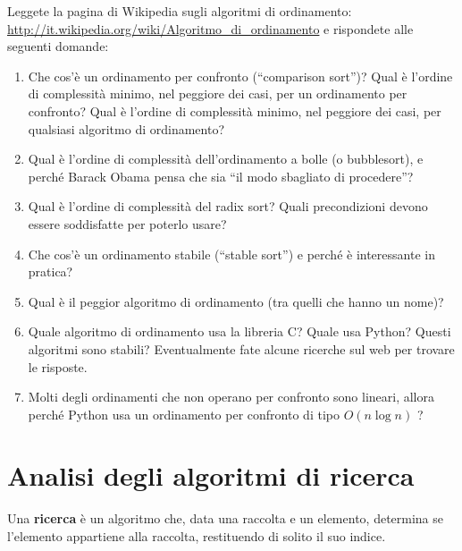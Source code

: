 \documentclass[10pt]{book}
\begin{document}
\vspace{0.2in}
\begin{exercise}

Leggete la pagina di Wikipedia sugli algoritmi di ordinamento:
\url{http://it.wikipedia.org/wiki/Algoritmo_di_ordinamento} e rispondete alle seguenti domande:

\begin{enumerate}

\item Che cos'è un ordinamento per confronto (``comparison sort'')? Qual è l'ordine di complessità minimo, nel peggiore dei casi, per un ordinamento per confronto? Qual è l'ordine di complessità minimo, nel peggiore dei casi, per qualsiasi algoritmo di ordinamento?

\item Qual è l'ordine di complessità dell'ordinamento a bolle (o bubblesort), e perché Barack Obama pensa che sia ``il modo sbagliato di procedere''?

\item Qual è l'ordine di complessità del radix sort? Quali precondizioni devono essere soddisfatte per poterlo usare?

\item Che cos'è un ordinamento stabile (``stable sort'') e perché è interessante in pratica?

\item Qual è il peggior algoritmo di ordinamento (tra quelli che hanno un nome)?

\item Quale algoritmo di ordinamento usa la libreria C? Quale usa Python? Questi algoritmi sono stabili? Eventualmente fate alcune ricerche sul web per trovare le risposte.

\item Molti degli ordinamenti che non operano per confronto sono lineari, allora perché Python usa un ordinamento per confronto di tipo $O(n \log n)$ ?

\end{enumerate}

\end{exercise}


\section{Analisi degli algoritmi di ricerca}

Una {\bf ricerca} è un algoritmo che, data una raccolta e un elemento, determina se l'elemento appartiene alla raccolta, restituendo di solito il suo indice.
\end{document}
